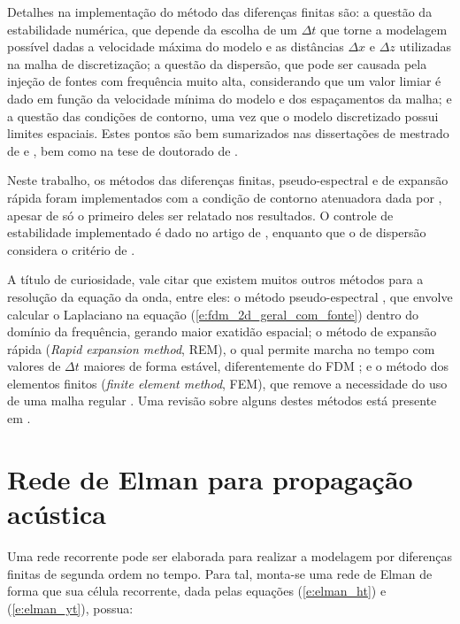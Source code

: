     Detalhes na implementação do método das diferenças finitas são: a questão da estabilidade numérica, que depende da escolha de um $\Delta t$ que torne a modelagem possível dadas a velocidade máxima do modelo e as distâncias $\Delta x$ e $\Delta z$ utilizadas na malha de discretização; a questão da dispersão, que pode ser causada pela injeção de fontes com frequência muito alta, considerando que um valor limiar é dado em função da velocidade mínima do modelo e dos espaçamentos da malha; e a questão das condições de contorno, uma vez que o modelo discretizado possui limites espaciais. Estes pontos são bem sumarizados nas dissertações de mestrado de  e , bem como na tese de doutorado de .

    Neste trabalho, os métodos das diferenças finitas, pseudo-espectral e de expansão rápida foram implementados com a condição de contorno atenuadora dada por , apesar de só o primeiro deles ser relatado nos resultados. O controle de estabilidade implementado é dado no artigo de , enquanto que o de dispersão considera o critério de .

    A título de curiosidade, vale citar que existem muitos outros métodos para a resolução da equação da onda, entre eles: o método pseudo-espectral , que envolve calcular o Laplaciano na equação (\ref{e:fdm_2d_geral_com_fonte}) dentro do domínio da frequência, gerando maior exatidão espacial; o método de expansão rápida (\textit{Rapid expansion method}, REM), o qual permite marcha no tempo com valores de $\Delta t$ maiores de forma estável, diferentemente do FDM ; e o método dos elementos finitos (\textit{finite element method}, FEM), que remove a necessidade do uso de uma malha regular . Uma revisão sobre alguns destes métodos está presente em .

  \section{Rede de Elman para propagação acústica} \label{s:rnn_modelagem}

    Uma rede recorrente pode ser elaborada para realizar a modelagem por diferenças finitas de segunda ordem no tempo. %
    Para tal, monta-se uma rede de Elman de forma que sua célula recorrente, dada pelas equações (\ref{e:elman_ht}) e (\ref{e:elman_yt}), possua:

